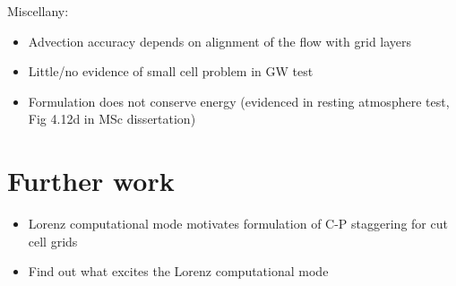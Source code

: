 \documentclass[a4paper]{article}
\begin{document}
Miscellany:
\begin{itemize}
	\item Advection accuracy depends on alignment of the flow with grid layers
	\item Little/no evidence of small cell problem in GW test
	\item Formulation does not conserve energy (evidenced in resting atmosphere test, Fig 4.12d in MSc dissertation)
\end{itemize}

\section{Further work}
\begin{itemize}
	\item Lorenz computational mode motivates formulation of C-P staggering for cut cell grids
	\item Find out what excites the Lorenz computational mode
\end{itemize}
\end{document}
